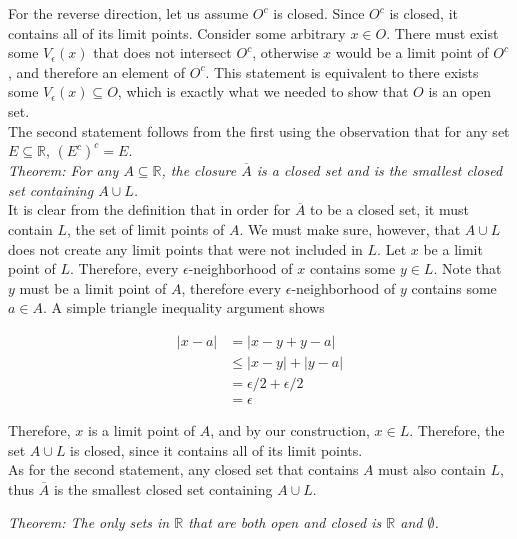\documentclass[12pt, letterpaper, twoside]{article}
\begin{document}
For the reverse direction, let us assume $O^c$ is closed. Since $O^c$ is closed, it contains all of its limit points. Consider some arbitrary $x \in O$. There must exist some $V_\epsilon (x)$ that does not intersect $O^c$, otherwise $x$ would be a limit point of $O^c$, and therefore an element of $O^c$. This statement is equivalent to there exists some $V_\epsilon (x) \subseteq O$, which is exactly what we needed to show that $O$ is an open set.  \\

The second statement follows from the first using the observation that for any set $E \subseteq \mathbb{R}$, $(E^c)^c = E$. \\

\textit{Theorem: For any $A \subseteq \mathbb{R}$, the closure $\overline{A}$ is a closed set and is the smallest closed set containing $A \cup L$.} \\

It is clear from the definition that in order for $\overline{A}$ to be a closed set, it must contain $L$, the set of limit points of $A$. We must make sure, however, that $A \cup L$ does not create any limit points that were not included in $L$. Let $x$ be a limit point of $L$. Therefore, every $\epsilon$-neighborhood of $x$ contains some $y \in L$. Note that $y$ must be a limit point of $A$, therefore every $\epsilon$-neighborhood of $y$ contains some $a \in A$. A simple triangle inequality argument shows 

\begin{equation*}
\begin{split}
    |x - a| &= |x - y + y - a| \\
    &\leq |x - y| + |y - a| \\
    &= \epsilon / 2 + \epsilon / 2 \\
    &= \epsilon
\end{split}
\end{equation*}

Therefore, $x$ is a limit point of $A$, and by our construction, $x \in L$. Therefore, the set $A \cup L$ is closed, since it contains all of its limit points. \\

As for the second statement, any closed set that contains $A$ must also contain $L$, thus $\overline{A}$ is the smallest closed set containing $A \cup L$. \\

\newpage

\textit{Theorem: The only sets in $\mathbb{R}$ that are both open and closed is $\mathbb{R}$ and $\emptyset$.} \\
\end{document}
